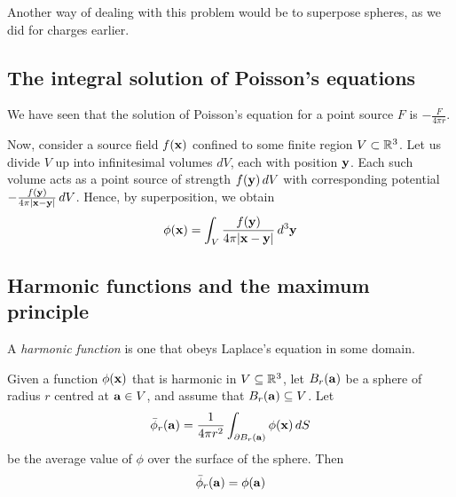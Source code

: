 \documentclass{../template/note}
\begin{document}
    \begin{remark*}
        Another way of dealing with this problem would be to superpose spheres, as we did for charges earlier.
    \end{remark*}
    
    \subsection{The integral solution of Poisson's equations}

    We have seen that the solution of Poisson's equation for a point source \(F\) is \(-\frac{F}{4\pi r}\).

    Now, consider a source field \(f(\V x)\) confined to some finite region \(V \subset \mathbb R^3\). Let us divide \(V\) up into infinitesimal volumes \(dV\), each with position \(\V y\). Each such volume acts as a point source of strength \(f(\V y) \D V\) with corresponding potential \(-\frac{f(\V y)}{4\pi|\V x-\V y|} \D V\). Hence, by superposition, we obtain
    \begin{align*}
        \phi(\V x) = \int_V \frac{f(\V y)}{4\pi |\V x - \V y|} \, d^3 \V y
    \end{align*}
    
    \subsection{Harmonic functions and the maximum principle}

    \begin{definition*}
        A \emph{harmonic function} is one that obeys Laplace's equation in some domain.
    \end{definition*}

    \begin{proposition*}
        Given a function \(\phi(\V x)\) that is harmonic in \(V \subseteq \mathbb R^3\), let \(B_r(\V a)\) be a sphere of radius \(r\) centred at \(\V a \in V\), and assume that \(B_r(\V a) \subseteq V\). Let
        \begin{align*}
            \bar{\phi}_r(\V a) = \frac 1 {4\pi r^2}\int_{\pr B_r(\V a)} \phi(\V x) \D S
        \end{align*}
        be the average value of \(\phi\) over the surface of the sphere. Then
        \begin{align*}
            \bar{\phi}_r(\V a) = \phi(\V a)
        \end{align*}
    \end{proposition*}
    
\end{document}
